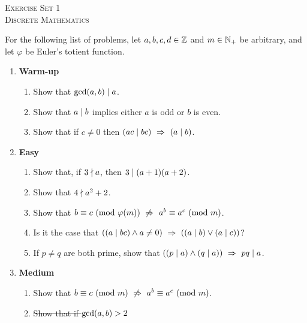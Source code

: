 




\begin{center}
    \textsc{\huge Exercise Set 1}\\
    \textsc{Discrete Mathematics}
\end{center}

For the following list of problems,
let $a, b, c, d \in \mathbb{Z}$ and $m \in \mathbb{N}_+$ be arbitrary,
and let $\varphi$ be Euler's totient function.
\begin{enumerate}
    \item \textbf{Warm-up}
        \begin{enumerate}
            \item
                Show that $\gcd\pn*{a, b} \divides a$.
            \item
                Show that $a \mid b$ implies either $a$ is odd or $b$ is even.
            \item
                Show that if $c \neq 0$ then $\pn*{ac \divides bc} \implies \pn*{a \divides b}$.
        \end{enumerate}
    \item \textbf{Easy}
        \begin{enumerate}
            \item
                Show that, if $3 \nmid a$, then $3 \mid (a + 1)(a + 2)$.
            \item
                Show that $4 \nmid a^2 + 2$.
            \item
                Show that $\modulo{b}{c}{\varphi(m)} \nimplies \modulo{a^b}{a^c}{m}$.
            \item
                Is it the case that $\pn*{\pn*{a \divides bc} \meet a \neq 0} \implies \pn*{\pn*{a \divides b} \join \pn*{a \divides c}}$?
            \item
                If $p \neq q$ are both prime,
                show that $\pn*{\pn*{p \divides a} \meet \pn*{q \divides a}} \implies pq \divides a$.
        \end{enumerate}
    \item \textbf{Medium}
        \begin{enumerate}
            \item
                Show that $\modulo{b}{c}{m} \nimplies \modulo{a^b}{a^c}{m}$.
            \item
                \sout{Show that if $\gcd\pn*{a, b} > 2$
}
\end{enumerate}
\end{enumerate}
